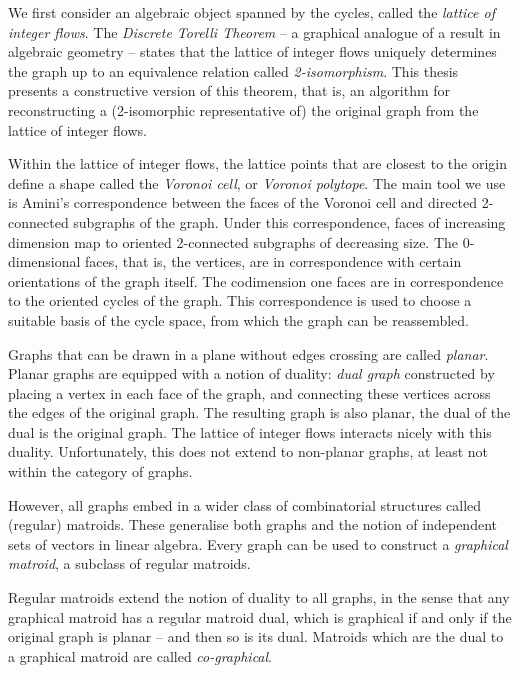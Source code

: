 \documentclass[12pt]{report}
\theoremstyle{definition}
\theoremstyle{upright}
\begin{document}
    We first consider an algebraic object spanned by the cycles, called the \textit{lattice of integer flows}.
    The \textit{Discrete Torelli Theorem} -- a graphical analogue of a result in algebraic geometry -- states that the lattice of integer flows uniquely determines the graph up to an equivalence relation called \textit{2-isomorphism}.
    This thesis presents a constructive version of this theorem, that is, an algorithm for reconstructing a (2-isomorphic representative of) the original graph from the lattice of integer flows.
    
    
    Within the lattice of integer flows, the lattice points that are closest to the origin define a shape called the \textit{Voronoi cell}, or \textit{Voronoi polytope}.
    The main tool we use is Amini's correspondence between the faces of the Voronoi cell and directed 2-connected subgraphs of the graph.
    Under this correspondence, faces of increasing dimension map to oriented 2-connected subgraphs of decreasing size.
    The $0$-dimensional faces, that is, the vertices, are in correspondence with certain orientations of the graph itself.
    The codimension one faces are in correspondence to the oriented cycles of the graph.
    This correspondence is used to choose a suitable basis of the cycle space, from which the graph can be reassembled.

    Graphs that can be drawn in a plane without edges crossing are called \textit{planar}.
    Planar graphs are equipped with a notion of duality: \textit{dual graph} constructed by placing a vertex in each face of the graph, and connecting these vertices across the edges of the original graph.
    The resulting graph is also planar, the dual of the dual is the original graph.
    The lattice of integer flows interacts nicely with this duality.
    Unfortunately, this does not extend to non-planar graphs, at least not within the category of graphs.

    However, all graphs embed in a wider class of combinatorial structures called (regular) matroids.
    These generalise both graphs and the notion of independent sets of vectors in linear algebra. 
    Every graph can be used to construct a \textit{graphical matroid}, a subclass of regular matroids.

    Regular matroids extend the notion of duality to all graphs, in the sense that any graphical matroid has a regular matroid dual, which is graphical if and only if the original graph is planar -- and then so is its dual. 
    Matroids which are the dual to a graphical matroid are called \textit{co-graphical}.
\end{document}
